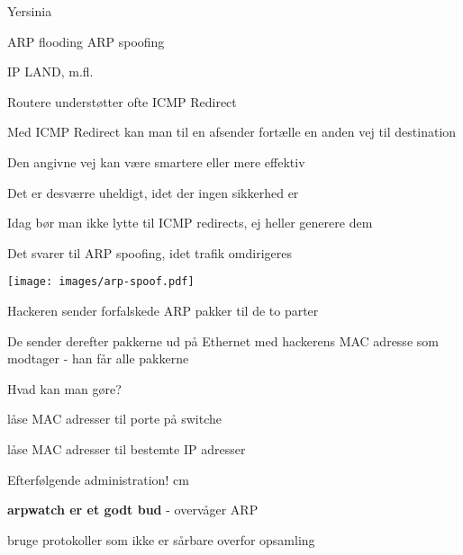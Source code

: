 \documentclass[Screen16to9,17pt]{foils}
\begin{document}

Yersinia

ARP flooding
ARP spoofing

IP
LAND, m.fl.



\begin{list1}
\item Routere understøtter ofte ICMP Redirect
\item Med ICMP Redirect kan man til en afsender fortælle en anden vej til destination
\item Den angivne vej kan være smartere eller mere effektiv
\item Det er desværre uheldigt, idet der ingen sikkerhed er
\item Idag bør man ikke lytte til ICMP redirects, ej heller generere dem
\item Det svarer til ARP spoofing, idet trafik omdirigeres
\end{list1}



\begin{center}
\colorbox{white}{\texttt{[image: images/arp-spoof.pdf]}}
\end{center}

\begin{list1}
\item Hackeren sender forfalskede ARP pakker til de to parter
\item De sender derefter pakkerne ud på Ethernet med hackerens MAC
  adresse som modtager - han får alle pakkerne
\end{list1}


\begin{list1}
\item Hvad kan man gøre?
\item låse MAC adresser til porte på switche
\item låse MAC adresser til bestemte IP adresser
\item Efterfølgende administration!
 cm
\item {\bfseries arpwatch er et godt bud} - overvåger ARP
\item bruge protokoller som ikke er sårbare overfor opsamling
\end{list1}


\end{document}
